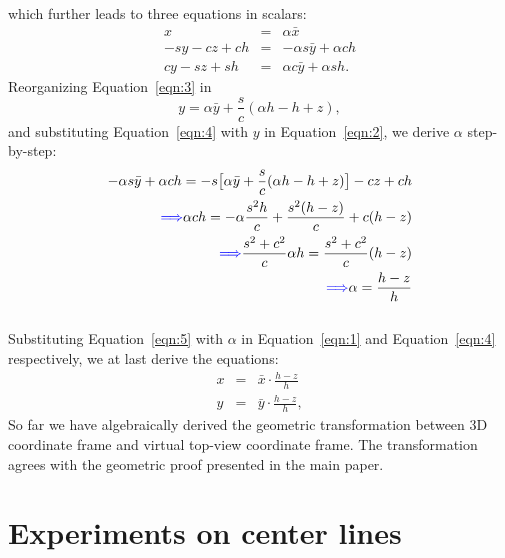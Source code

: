 \documentclass[10pt,twocolumn,letterpaper]{article}
\begin{document}
\noindent which further leads to three equations in scalars:
\begin{eqnarray}
    x &=& \alpha \bar{x} \label{eqn:1} \\
    -sy - cz + ch &=& -\alpha s \bar{y} + \alpha ch \label{eqn:2}\\
    cy - sz + sh &=& \alpha c \bar{y} + \alpha sh \label{eqn:3}.
\end{eqnarray}
Reorganizing Equation~\ref{eqn:3} in
\begin{equation}
    y = \alpha \bar{y} + \frac{s}{c}(\alpha h - h + z), \label{eqn:4}
\end{equation}
\noindent and substituting Equation~\ref{eqn:4} with $y$ in Equation~\ref{eqn:2}, we derive $\alpha$ step-by-step:
\\
\begin{eqnarray}
    -\alpha s \bar{y} + \alpha c h = -s \big[ \alpha \bar{y} + \frac{s}{c}(\alpha h - h + z) \big] - c z + ch \nonumber \\
   {\color{blue}\Longrightarrow} \alpha c h = - \alpha \frac{s^2 h}{c} + \frac{s^2 (h-z)}{c} + c(h-z) \nonumber\\
   {\color{blue}\Longrightarrow }\space\space   \frac{s^2 + c^2}{c} \alpha h = \frac{s^2 + c^2}{c} (h-z) \nonumber\\
   {\color{blue}\Longrightarrow \space\space } \alpha = \frac{h-z}{h} \label{eqn:5}
\end{eqnarray}
\\
Substituting Equation~\ref{eqn:5} with $\alpha$ in Equation~\ref{eqn:1} and Equation~\ref{eqn:4} respectively, we at last derive the equations:
\begin{eqnarray}
    \label{eqn:sim_geo1}
        x &=& \bar{x} \cdot \frac{h - z}{h}\\ 
    \label{eqn:sim_geo2}
        y &=& \bar{y} \cdot \frac{h - z}{h},
\end{eqnarray}
So far we have algebraically derived the geometric transformation between 3D coordinate frame and virtual top-view coordinate frame. The transformation agrees with the geometric proof presented in the main paper.





\section{Experiments on center lines}
\label{sec:exp:centerline}
\end{document}
